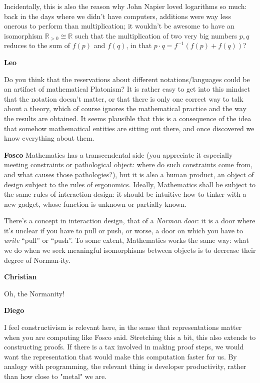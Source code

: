 \documentclass{amsart}
\newcommand{\respond}[1]{
  \vspace{1em} \textbf{#1}
}
\begin{document}
Incidentally, this is also the reason why John Napier loved logarithms so much: back in the days where we didn't have computers, additions were way less onerous to perform than multiplication; it wouldn't be awesome to have an isomorphism $\mathbb R_{>0} \cong \mathbb R$ such that the multiplication of two very big numbers $p,q$ reduces to the sum of $f(p)$ and $f(q)$, in that $p\cdot q = f^{-1}(f(p) + f(q))$?

\respond{Leo}
Do you think that the reservations about different notations/languages could be an artifact of mathematical Platonism? It is rather easy to get into this mindset that the notation doesn't matter, or that there is only one correct way to talk about a theory, which of course ignores the mathematical practice and the way the results are obtained. It seems plausible that this is a consequence of the idea that somehow mathematical entities are sitting out there, and once discovered we know everything about them.

\respond{Fosco} Mathematics has a transcendental side (you appreciate it especially meeting constraints or pathological object: where do such constraints come from, and what causes those pathologies?), but it is also a human product, an object of design subject to the rules of ergonomics. Ideally, Mathematics shall be subject to the same rules of interaction design: it should be intuitive how to tinker with a new gadget, whose function is unknown or partially known.

There's a concept in interaction design, that of a \emph{Norman door}: it is a door where it's unclear if you have to pull or push, or worse, a door on which you have to \emph{write} ``pull'' or ``push''. To some extent, Mathematics works the same way: what we do when we seek meaningful isomorphisms between objects is to decrease their degree of Norman-ity.

\respond{Christian}
Oh, the Normanity!

\respond{Diego}
I feel constructivism is relevant here, in the sense that representations matter when you are
computing like Fosco said. Stretching this a bit, this also extends to constructing proofs.
If there is a tax involved in making proof steps, we would want the representation that
would make this computation faster for us. By analogy with programming, the relevant thing
is developer productivity, rather than how close to "metal" we are.
\end{document}
